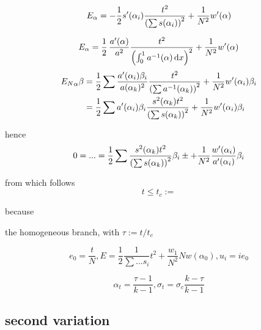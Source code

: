 \documentclass[]{article}
\renewcommand*\d{\mathop{}\!\mathrm{d}} %
\begin{document}
\begin{equation}
    \label{eqn:}
    E_\alpha
    =
-\frac12 s'(\alpha_i) \frac{t^2}{\left( \sum s(\alpha_i)  \right)^2} + \frac{1}{N^2} w'(\alpha)
\end{equation}

\begin{equation}
    \label{eqn:}
    E_\alpha
    =
\frac12 \, \frac{a'(\alpha)}{a^2 } \frac{\load^2}{\left( \int_0^1 a^{-1}(\alpha) \d x \right)^2} + \frac{1}{N^2} w'(\alpha)
\end{equation}
\begin{align}
    \label{eqn:}
    {E_N}_\alpha \beta
    & =
\frac12 \sum\frac{a'(\alpha_i)\beta_i}{a(\alpha_k)^2 } \frac{t^2}{\left( \sum a^{-1}(\alpha_k) \right)^2} + \frac{1}{N^2} w'(\alpha_i)\beta_i \\
& =
\frac12 \sum  a'(\alpha_i)\beta_i \frac{ s^2(\alpha_k) t^2}{\left( \sum s(\alpha_k) \right)^2} + \frac{1}{N^2} w'(\alpha_i)\beta_i \\
\end{align}

hence 
\begin{equation}
    \label{eqn:}
    0=...=
    \frac12 \sum   \frac{ s^2(\alpha_k) t^2}{\left( \sum s(\alpha_k) \right)^2}\beta_i 
\pm+ \frac{1}{N^2} \frac{w'(\alpha_i)}{a'(\alpha_i)}\beta_i \\
\end{equation}

from which follows
\begin{equation}
    \label{eqn:}
    t\leq t_c :=
\end{equation}

because 

the homogeneous branch, with $\tau:=t/t_c$

\begin{equation}
    \label{eqn:}
    e_0 = \frac{t}{N}, E =\frac{1}{2}\frac{1}{\sum ... s_i}t^2 + \frac{w_1}{N^2}N w(\alpha_0), u_i = i e_0
\end{equation}

\begin{equation}
    \label{eqn:}
    \alpha_t = \frac{\tau-1}{k-1}, \sigma_t = \sigma_c \frac{k-\tau}{k-1}
\end{equation}



\subsection{second variation}
\end{document}
